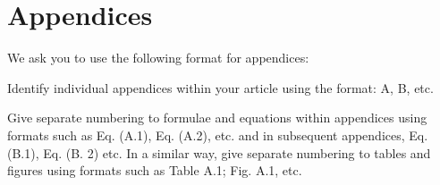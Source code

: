\documentclass[preprint,12pt]{elsarticle}
\begin{document}
\section{Appendices}
We ask you to use the following format for appendices:

Identify individual appendices within your article using the format: A, B, etc.

Give separate numbering to formulae and equations within appendices using formats such as Eq. (A.1), Eq. (A.2), etc. and in subsequent appendices, Eq. (B.1), Eq. (B. 2) etc. In a similar way, give separate numbering to tables and figures using formats such as Table A.1; Fig. A.1, etc.







\end{document}
